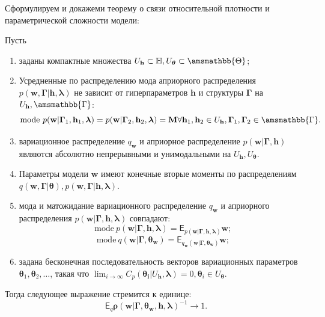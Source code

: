 Сформулируем и докажеми теорему о связи относительной плотности и параметрической сложности модели:

\begin{theorem}
Пусть
\begin{enumerate}
\item заданы компактные множества $U_\mathbf{h} \subset \mathbb{H}, U_{\boldsymbol{\theta}} \subset \amsmathbb{\Theta}$;


\item Усредненные по распределению мода априорного распределения $p(\mathbf{w},\boldsymbol{\Gamma}| \mathbf{h}, \boldsymbol{\lambda})$ не зависит от гиперпараметров $\mathbf{h}$ и структуры $\boldsymbol{\Gamma}$ на $U_\mathbf{h}, \amsmathbb{\Gamma}$:
\[
    \text{mode}~p(\mathbf{w}|\boldsymbol{\Gamma}_1, \mathbf{h}_1, \boldsymbol{\lambda}) = p(\mathbf{w}|\boldsymbol{\Gamma}_2, \mathbf{h}_2, \boldsymbol{\lambda}) = \mathbf{M} \forall \mathbf{h}_1, \mathbf{h}_2 \in U_\mathbf{h}, \boldsymbol{\Gamma}_1, \boldsymbol{\Gamma}_2 \in \amsmathbb{\Gamma}.
\]

\item вариационное распределение $q_\mathbf{w}$ и априорное распределение $p(\mathbf{w}|\boldsymbol{\Gamma}, \mathbf{h})$  являются абсолютно непрерывными и унимодальными на  $U_\mathbf{h}, U_{\boldsymbol{\theta}}$.

\item Параметры модели $\mathbf{w}$ имеют конечные вторые моменты по распределениям $q(\mathbf{w}, \boldsymbol{\Gamma}|\boldsymbol{\theta}), p(\mathbf{w}, \boldsymbol{\Gamma}|\mathbf{h}, \boldsymbol{\lambda})$.

\item мода и матожидание вариационного распределение $q_\mathbf{w}$ и априорного распределения $p(\mathbf{w}|\boldsymbol{\Gamma},\mathbf{h}, \boldsymbol{\lambda})$  совпадают:
\[
    \text{mode}~p(\mathbf{w}|\boldsymbol{\Gamma},\mathbf{h}, \boldsymbol{\lambda}) = \mathsf{E}_{p(\mathbf{w}| \boldsymbol{\Gamma}, \mathbf{h}, \boldsymbol{\lambda})} \mathbf{w};
\]
\[
  \text{mode}~q(\mathbf{w}|\boldsymbol{\Gamma}, \boldsymbol{\theta}_\mathbf{w}) = \mathsf{E}_{q_\mathbf{w}(\mathbf{w}|\boldsymbol{\Gamma},  \boldsymbol{\theta}_\mathbf{w})} \mathbf{w};
\]

\item задана  бесконечная последовательность векторов вариационных параметров $\boldsymbol{\theta}_1,\boldsymbol{\theta}_2,\dots$, такая что $\lim_{i \to \infty}C_p(\boldsymbol{\theta_i}|U_{\mathbf{h}}, \boldsymbol{\lambda}) = 0, \boldsymbol{\theta}_i \in U_{\boldsymbol{\theta}}.$ 

\end{enumerate}
Тогда следующее выражение стремится к единице:
\[
   \mathsf{E}_q \boldsymbol{\rho}(\mathbf{w}|\boldsymbol{\Gamma}, \boldsymbol{\theta}_\mathbf{w}, \mathbf{h},\boldsymbol{\lambda})^{-1} \to 1.
\]


\end{theorem}

